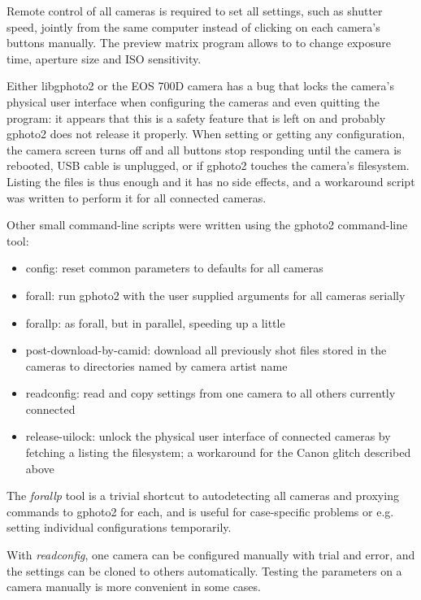 Remote control of all cameras is required to set all settings, such as shutter speed, jointly from the same computer instead of clicking on each camera's buttons manually.
The preview matrix program allows to to change exposure time, aperture size and ISO sensitivity.

Either libgphoto2 or the EOS 700D camera has a bug that locks the camera's physical user interface when configuring the cameras and even quitting the program:
it appears that this is a safety feature that is left on and probably gphoto2 does not release it properly.
When setting or getting any configuration, the camera screen turns off and all buttons stop responding until the camera is rebooted, USB cable is unplugged, or if gphoto2 touches the camera's filesystem.
Listing the files is thus enough and it has no side effects, and a workaround script was written to perform it for all connected cameras.

Other small command-line scripts were written using the gphoto2 command-line tool:

\begin{itemize}
\item config: reset common parameters to defaults for all cameras
\item forall: run gphoto2 with the user supplied arguments for all cameras serially
\item forallp: as forall, but in parallel, speeding up a little
\item post-download-by-camid: download all previously shot files stored in the cameras to directories named by camera artist name
\item readconfig: read and copy settings from one camera to all others currently connected
\item release-uilock: unlock the physical user interface of connected cameras by fetching a listing the filesystem; a workaround for the Canon glitch described above
\end{itemize}

The \emph{forallp} tool is a trivial shortcut to autodetecting all cameras and proxying commands to gphoto2 for each, and is useful for case-specific problems or e.g. setting individual configurations temporarily.

With \emph{readconfig}, one camera can be configured manually with trial and error, and the settings can be cloned to others automatically.
Testing the parameters on a camera manually is more convenient in some cases.


